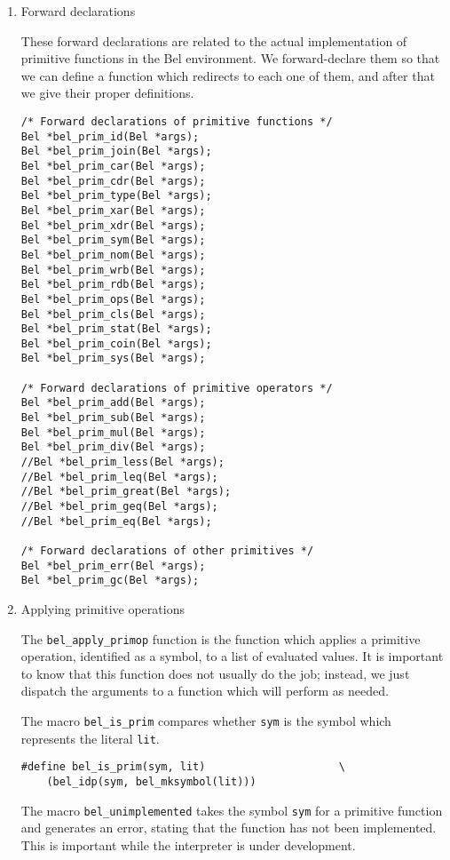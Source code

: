 \documentclass[openright,a4paper,twoside,12pt]{memoir}
\begin{document}
\begin{enumerate}
\item Forward declarations
\label{sec:org6dd25ee}

These forward declarations are related to the actual implementation of
primitive functions in the Bel environment. We forward-declare them so
that we can define a function which redirects to each one of them, and
after that we give their proper definitions.

\begin{verbatim}
/* Forward declarations of primitive functions */
Bel *bel_prim_id(Bel *args);
Bel *bel_prim_join(Bel *args);
Bel *bel_prim_car(Bel *args);
Bel *bel_prim_cdr(Bel *args);
Bel *bel_prim_type(Bel *args);
Bel *bel_prim_xar(Bel *args);
Bel *bel_prim_xdr(Bel *args);
Bel *bel_prim_sym(Bel *args);
Bel *bel_prim_nom(Bel *args);
Bel *bel_prim_wrb(Bel *args);
Bel *bel_prim_rdb(Bel *args);
Bel *bel_prim_ops(Bel *args);
Bel *bel_prim_cls(Bel *args);
Bel *bel_prim_stat(Bel *args);
Bel *bel_prim_coin(Bel *args);
Bel *bel_prim_sys(Bel *args);

/* Forward declarations of primitive operators */
Bel *bel_prim_add(Bel *args);
Bel *bel_prim_sub(Bel *args);
Bel *bel_prim_mul(Bel *args);
Bel *bel_prim_div(Bel *args);
//Bel *bel_prim_less(Bel *args);
//Bel *bel_prim_leq(Bel *args);
//Bel *bel_prim_great(Bel *args);
//Bel *bel_prim_geq(Bel *args);
//Bel *bel_prim_eq(Bel *args);

/* Forward declarations of other primitives */
Bel *bel_prim_err(Bel *args);
Bel *bel_prim_gc(Bel *args);
\end{verbatim}

\item Applying primitive operations
\label{sec:orgb79aef2}

The \texttt{bel\_apply\_primop} function is the function which applies a
primitive operation, identified as a symbol, to a list of evaluated
values. It is important to know that this function does not usually do
the job; instead, we just dispatch the arguments to a function which
will perform as needed.

The macro \texttt{bel\_is\_prim} compares whether \texttt{sym} is the symbol which
represents the literal \texttt{lit}.

\begin{verbatim}
#define bel_is_prim(sym, lit)                     \
    (bel_idp(sym, bel_mksymbol(lit)))
\end{verbatim}

The macro \texttt{bel\_unimplemented} takes the symbol \texttt{sym} for a primitive
function and generates an error, stating that the function has not
been implemented. This is important while the interpreter is under
development.


\end{enumerate}
\end{document}
